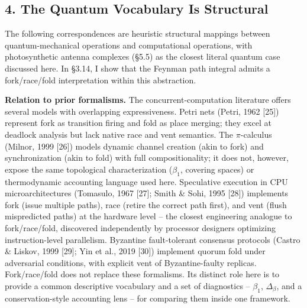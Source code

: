 \documentclass[
  11pt,
]{article}
\begin{document}
\subsection{4. The Quantum Vocabulary Is
Structural}\label{the-quantum-vocabulary-is-structural}

The following correspondences are heuristic structural mappings between
quantum-mechanical operations and computational operations, with
photosynthetic antenna complexes (§5.5) as the closest literal quantum
case discussed here. In §3.14, I show that the Feynman path integral
admits a fork/race/fold interpretation within this abstraction.

\textbf{Relation to prior formalisms.} The concurrent-computation
literature offers several models with overlapping expressiveness. Petri
nets (Petri, 1962 {[}25{]}) represent fork as transition firing and fold
as place merging; they excel at deadlock analysis but lack native race
and vent semantics. The \(\pi\)-calculus (Milnor, 1999 {[}26{]}) models
dynamic channel creation (akin to fork) and synchronization (akin to
fold) with full compositionality; it does not, however, expose the same
topological characterization (\(\beta_1\), covering spaces) or
thermodynamic accounting language used here. Speculative execution in
CPU microarchitectures (Tomasulo, 1967 {[}27{]}; Smith \& Sohi, 1995
{[}28{]}) implements fork (issue multiple paths), race (retire the
correct path first), and vent (flush mispredicted paths) at the hardware
level -- the closest engineering analogue to fork/race/fold, discovered
independently by processor designers optimizing instruction-level
parallelism. Byzantine fault-tolerant consensus protocols (Castro \&
Liskov, 1999 {[}29{]}; Yin et al., 2019 {[}30{]}) implement quorum fold
under adversarial conditions, with explicit vent of Byzantine-faulty
replicas. Fork/race/fold does not replace these formalisms. Its distinct
role here is to provide a common descriptive vocabulary and a set of
diagnostics -- \(\beta_1\), \(\Delta_\beta\), and a conservation-style
accounting lens -- for comparing them inside one framework.
\end{document}
